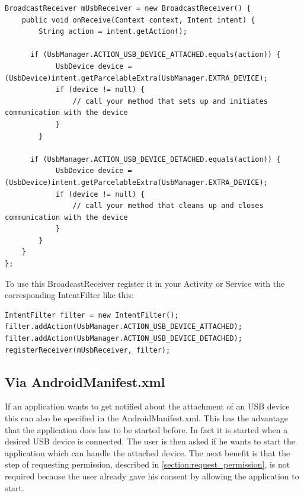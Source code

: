 \begin{lstlisting}[caption=Attach and detach notification of USB devices via BroadcastReceivers, label=listing:attach_broadcast]
BroadcastReceiver mUsbReceiver = new BroadcastReceiver() {
    public void onReceive(Context context, Intent intent) {
        String action = intent.getAction(); 

      if (UsbManager.ACTION_USB_DEVICE_ATTACHED.equals(action)) {
            UsbDevice device = (UsbDevice)intent.getParcelableExtra(UsbManager.EXTRA_DEVICE);
            if (device != null) {
                // call your method that sets up and initiates communication with the device
            }
        }

      if (UsbManager.ACTION_USB_DEVICE_DETACHED.equals(action)) {
            UsbDevice device = (UsbDevice)intent.getParcelableExtra(UsbManager.EXTRA_DEVICE);
            if (device != null) {
                // call your method that cleans up and closes communication with the device
            }
        }
    }
};
\end{lstlisting}

To use this BroadcastReceiver register it in your Activity or Service with the corresponding IntentFilter like this:

\begin{lstlisting}[caption=Register the BroadcastReceiver with the desired actions, label=listing:attach_register]
IntentFilter filter = new IntentFilter();
filter.addAction(UsbManager.ACTION_USB_DEVICE_ATTACHED);
filter.addAction(UsbManager.ACTION_USB_DEVICE_DETACHED);
registerReceiver(mUsbReceiver, filter);
\end{lstlisting}

\subsection{Via AndroidManifest.xml}

If an application wants to get notified about the attachment of an USB device this can also be specified in the AndroidManifest.xml. This has the advantage that the application does has to be started before. In fact it is started when a desired USB device is connected. The user is then asked if he wants to start the application which can handle the attached device. The next benefit is that the step of requesting permission, described in \ref{section:request_permission}, is not required because the user already gave his consent by allowing the application to start.

